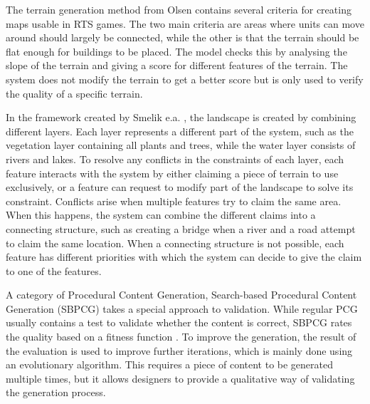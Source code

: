 The terrain generation method from Olsen \cite{olsen_realtime_2004} contains several criteria for creating maps usable in RTS games. The two main criteria are areas where units can move around should largely be connected, while the other is that the terrain should be flat enough for buildings to be placed. The model checks this by analysing the slope of the terrain and giving a score for different features of the terrain. The system does not modify the terrain to get a better score but is only used to verify the quality of a specific terrain.

In the framework created by Smelik e.a. \cite{smelik_declarative_2011}, the landscape is created by combining different layers. Each layer represents a different part of the system, such as the vegetation layer containing all plants and trees, while the water layer consists of rivers and lakes. To resolve any conflicts in the constraints of each layer, each feature interacts with the system by either claiming a piece of terrain to use exclusively, or a feature can request to modify part of the landscape to solve its constraint. Conflicts arise when multiple features try to claim the same area. When this happens, the system can combine the different claims into a connecting structure, such as creating a bridge when a river and a road attempt to claim the same location. When a connecting structure is not possible, each feature has different priorities with which the system can decide to give the claim to one of the features.

A category of Procedural Content Generation, Search-based Procedural Content Generation (SBPCG) takes a special approach to validation. While regular PCG usually contains a test to validate whether the content is correct, SBPCG rates the quality based on a fitness function \cite{togelius_search-based_2010}. To improve the generation, the result of the evaluation is used to improve further iterations, which is mainly done using an evolutionary algorithm. This requires a piece of content to be generated multiple times, but it allows designers to provide a qualitative way of validating the generation process.

